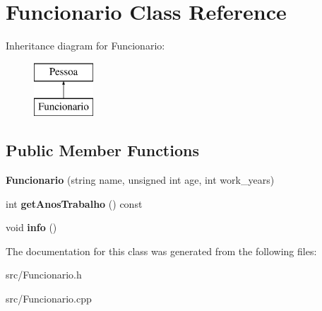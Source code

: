\hypertarget{class_funcionario}{}\section{Funcionario Class Reference}
\label{class_funcionario}
Inheritance diagram for Funcionario\+:\begin{figure}[H]
\begin{center}
\leavevmode
\includegraphics[height=2.000000cm]{class_funcionario}
\end{center}
\end{figure}
\subsection*{Public Member Functions}
\begin{DoxyCompactItemize}
\item 
\hypertarget{class_funcionario_affa57075f3e127d0d130e447e556207d}{}{\bfseries Funcionario} (string name, unsigned int age, int work\+\_\+years)\label{class_funcionario_affa57075f3e127d0d130e447e556207d}

\item 
\hypertarget{class_funcionario_a45068128fc425fda098cb113c0261693}{}int {\bfseries get\+Anos\+Trabalho} () const \label{class_funcionario_a45068128fc425fda098cb113c0261693}

\item 
\hypertarget{class_funcionario_a10fd5433afc1c2ef2061cf572429cb26}{}void {\bfseries info} ()\label{class_funcionario_a10fd5433afc1c2ef2061cf572429cb26}

\end{DoxyCompactItemize}


The documentation for this class was generated from the following files\+:\begin{DoxyCompactItemize}
\item 
src/Funcionario.\+h\item 
src/Funcionario.\+cpp\end{DoxyCompactItemize}
